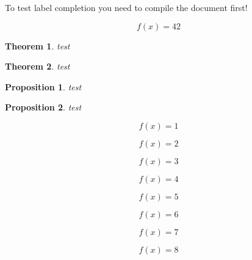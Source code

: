 \documentclass{article}
\newtheorem{theorem}{Theorem}
\newtheorem{proposition}{Proposition}
\begin{document}
To test label completion you need to compile the document first!

\begin{equation}
  f(x) = 42
  \label{eq:main-is-working}
\end{equation}

\begin{theorem}
  \label{th:first}
  test
\end{theorem}

\begin{theorem}
  \label{th:second}
  test
\end{theorem}

\begin{proposition}
  \label{prop:first}
  test
\end{proposition}

\begin{proposition}
  \label{prop:second}
  test
\end{proposition}







\begin{equation}
  \label{eq:test1}
  f(x) = 1
\end{equation}

\begin{equation}
  \label{eq:test2}
  f(x) = 2
\end{equation}

\begin{equation}
  \label{eq:test3}
  f(x) = 3
\end{equation}

\begin{equation}
  \label{eq:test4}
  f(x) = 4
\end{equation}

\begin{equation}
  \label{eq:test5}
  f(x) = 5
\end{equation}

\begin{equation}
  \label{eq:test6}
  f(x) = 6
\end{equation}

\begin{equation}
  \label{eq:test7}
  f(x) = 7
\end{equation}

\begin{equation}
  \label{eq:test8}
  f(x) = 8
\end{equation}
\end{document}
